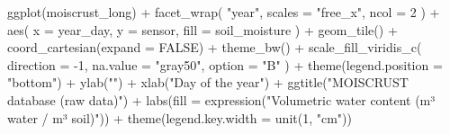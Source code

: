 \documentclass[
  table]{article}
\newenvironment{Shaded}{\begin{snugshade}}{\end{snugshade}}
\newcommand{\AttributeTok}[1]{\textcolor[rgb]{0.77,0.63,0.00}{#1}}
\newcommand{\ConstantTok}[1]{\textcolor[rgb]{0.00,0.00,0.00}{#1}}
\newcommand{\DecValTok}[1]{\textcolor[rgb]{0.00,0.00,0.81}{#1}}
\newcommand{\FunctionTok}[1]{\textcolor[rgb]{0.00,0.00,0.00}{#1}}
\newcommand{\NormalTok}[1]{#1}
\newcommand{\SpecialCharTok}[1]{\textcolor[rgb]{0.00,0.00,0.00}{#1}}
\newcommand{\StringTok}[1]{\textcolor[rgb]{0.31,0.60,0.02}{#1}}
\begin{document}
\begin{Shaded}
\begin{Highlighting}[]
\FunctionTok{ggplot}\NormalTok{(moiscrust\_long) }\SpecialCharTok{+} 
  \FunctionTok{facet\_wrap}\NormalTok{(}
    \StringTok{"year"}\NormalTok{, }
    \AttributeTok{scales =} \StringTok{"free\_x"}\NormalTok{, }
    \AttributeTok{ncol =} \DecValTok{2}
\NormalTok{    ) }\SpecialCharTok{+}
  \FunctionTok{aes}\NormalTok{(}
    \AttributeTok{x =}\NormalTok{ year\_day, }
    \AttributeTok{y =}\NormalTok{ sensor, }
    \AttributeTok{fill =}\NormalTok{ soil\_moisture}
\NormalTok{    ) }\SpecialCharTok{+} 
  \FunctionTok{geom\_tile}\NormalTok{() }\SpecialCharTok{+} 
  \FunctionTok{coord\_cartesian}\NormalTok{(}\AttributeTok{expand =} \ConstantTok{FALSE}\NormalTok{) }\SpecialCharTok{+}
  \FunctionTok{theme\_bw}\NormalTok{() }\SpecialCharTok{+} 
  \FunctionTok{scale\_fill\_viridis\_c}\NormalTok{(}
    \AttributeTok{direction =} \SpecialCharTok{{-}}\DecValTok{1}\NormalTok{, }
    \AttributeTok{na.value =} \StringTok{"gray50"}\NormalTok{, }
    \AttributeTok{option =} \StringTok{"B"}
\NormalTok{    ) }\SpecialCharTok{+} 
  \FunctionTok{theme}\NormalTok{(}\AttributeTok{legend.position =} \StringTok{"bottom"}\NormalTok{) }\SpecialCharTok{+} 
  \FunctionTok{ylab}\NormalTok{(}\StringTok{""}\NormalTok{) }\SpecialCharTok{+} 
  \FunctionTok{xlab}\NormalTok{(}\StringTok{"Day of the year"}\NormalTok{) }\SpecialCharTok{+}
  \FunctionTok{ggtitle}\NormalTok{(}\StringTok{"MOISCRUST database (raw data)"}\NormalTok{) }\SpecialCharTok{+}
  \FunctionTok{labs}\NormalTok{(}\AttributeTok{fill =} \FunctionTok{expression}\NormalTok{(}\StringTok{"Volumetric water content (m³ water / m³ soil)"}\NormalTok{)) }\SpecialCharTok{+} 
  \FunctionTok{theme}\NormalTok{(}\AttributeTok{legend.key.width =} \FunctionTok{unit}\NormalTok{(}\DecValTok{1}\NormalTok{, }\StringTok{"cm"}\NormalTok{))}
\end{Highlighting}
\end{Shaded}
\end{document}
